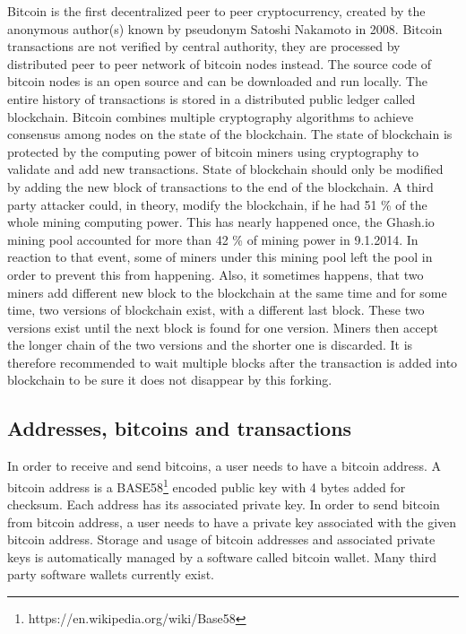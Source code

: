 \documentclass[
  digital, %
  table,   %
  lof,     %
  lot,     %
  oneside
]{fithesis3}
\begin{document}
Bitcoin \parencite{nakamoto2008bitcoin} is the first decentralized peer to peer cryptocurrency,
created by the anonymous author(s) known by pseudonym Satoshi Nakamoto in 2008.
Bitcoin transactions are not verified by central authority, they are processed by distributed peer to peer network of bitcoin nodes instead. 
The source code of bitcoin nodes is an open source and can be downloaded and run locally. 
The entire history of transactions is stored in a distributed public ledger called blockchain.
Bitcoin combines multiple cryptography algorithms to achieve consensus among nodes
on the state of the blockchain.
The state of blockchain is protected by the computing power of bitcoin miners
using cryptography to validate and add new transactions.
State of blockchain should only be modified by adding the new block of transactions to the end of the blockchain.
A third party attacker could, in theory, modify the blockchain, if he had 51 \% of the whole mining computing power.
This has nearly happened once, the Ghash.io mining pool accounted for more than 42 \% of mining power in 9.1.2014. In reaction to that event, some of miners under this mining pool left the pool in order to prevent this from happening.
Also, it sometimes happens, that two miners add different new block to the blockchain at the same time
and for some time, two versions of blockchain exist, with a different last block.
These two versions exist until the next block is found for one version.
Miners then accept the longer chain of the two versions and the shorter one is discarded.
It is therefore recommended to wait multiple blocks after the transaction is added into blockchain
to be sure it does not disappear by this forking.
 
\subsection{Addresses, bitcoins and transactions}
\label{btcadd}
In order to receive and send bitcoins, a user needs to have a bitcoin address.
A bitcoin address is a BASE58\footnote{https://en.wikipedia.org/wiki/Base58}
encoded public key with 4 bytes added for checksum.
Each address has its associated private key.
In order to send bitcoin from bitcoin address,
a user needs to have a private key associated with the given bitcoin address.
Storage and usage of bitcoin addresses and associated private keys is automatically managed
by a software called bitcoin wallet. Many third party software wallets currently exist.
\end{document}
